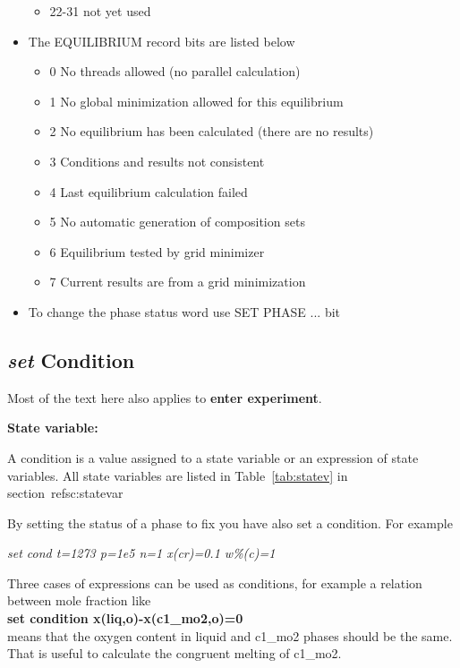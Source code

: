 \documentclass[11pt]{article}
\begin{document}
\begin{itemize}
\begin{itemize}
  \item  22-31 not yet used
  \end{itemize}
\item The EQUILIBRIUM record bits are listed below
  \begin{itemize}
  \item   0  No threads allowed (no parallel calculation)
  \item   1  No global minimization allowed for this equilibrium
  \item   2  No equilibrium has been calculated (there are no results)
  \item   3  Conditions and results not consistent
  \item   4  Last equilibrium calculation failed
  \item   5  No automatic generation of composition sets
  \item   6  Equilibrium tested by grid minimizer
  \item   7  Current results are from a grid minimization
  \end{itemize}
\item To change the phase status word use SET PHASE ... bit
\end{itemize}
\hypertarget{Info conditions}{}
\hypertarget{Set condition}{}
\subsection{{\em set} Condition}\label{sc:setcond}

Most of the text here also applies to {\bf enter experiment}.

{\bf State variable:}

A condition is a value assigned to a state variable or an expression
of state variables.  All state variables are listed in
Table~\ref{tab:statev} in section~ref{sc:statevar}

By setting the status of a phase to fix you have
also set a condition.  For example

{\em set cond t=1273 p=1e5 n=1 x(cr)=0.1 w\%(c)=1}

Three cases of expressions can be used as conditions, for example a
relation between mole fraction like\\
{\bf set condition x(liq,o)-x(c1\_mo2,o)=0}\\
means that the oxygen content in liquid and c1\_mo2 phases should be the
same.  That is useful to calculate the congruent melting of c1\_mo2.
\end{document}
